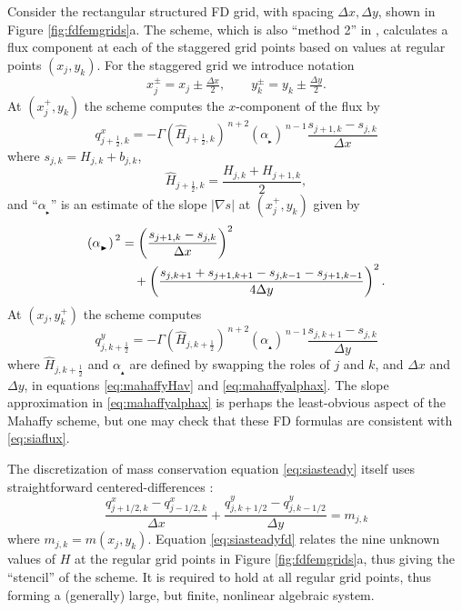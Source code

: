 \documentclass[twocolumn,letterpaper]{igs}
\newcommand{\grad}{\nabla}
\newcommand\alpharight{\alpha_{{}_{\blacktriangleright}}}
\newcommand\alphaup{\alpha_{{\!}_{\blacktriangle}}}
\newcommand{\dxtwo}{\tfrac{\Delta x}{2}}
\newcommand{\dytwo}{\tfrac{\Delta y}{2}}
\newcommand{\half}{\tfrac{1}{2}}
\begin{document}
Consider the rectangular structured FD grid, with spacing $\Delta x,\Delta y$, shown in Figure \ref{fig:fdfemgrids}a.  The \cite{Mahaffy1976} scheme, which is also ``method 2'' in \citep{HindmarshPayne1996}, calculates a flux component at each of the staggered grid points based on values at regular points $(x_j,y_k)$.  For the staggered grid we introduce notation
\begin{equation}
x_j^\pm = x_j \pm \dxtwo, \qquad y_k^\pm = y_k \pm \dytwo. \label{eq:definexypm}
\end{equation}
At $(x_j^+,y_k)$ the scheme computes the $x$-component of the flux by
\begin{equation}
q^x_{j+\half,k} = - \Gamma \left(\hat H_{j+\half,k}\right)^{\,n+2} \left(\alpharight\right)^{\,n-1} \frac{s_{j+1,k} - s_{j,k}}{\Delta x}  \label{eq:mahaffyqx}
\end{equation}
where $s_{j,k} = H_{j,k} + b_{j,k}$,
\begin{equation}
  \hat H_{j+\half,k} = \frac{H_{j,k} + H_{j+1,k}}{2},  \label{eq:mahaffyHav}
\end{equation}
and ``$\alpharight$\!'' is an estimate of the slope $|\grad s|$ at $(x_j^+,y_k)$ given by
\begin{align}
\left(\alpharight\right)^{\,2} &= \left(\frac{s_{j+1,k} - s_{j,k}}{\Delta x}\right)^2  \label{eq:mahaffyalphax} \\
  &\quad + \left(\frac{s_{j,k+1} + s_{j+1,k+1} - s_{j,k-1} - s_{j+1,k-1}}{4 \Delta y}\right)^2. \notag
\end{align}
At $(x_j,y_k^+)$ the scheme computes
\begin{equation}
q^y_{j,k+\half} = - \Gamma \left(\hat H_{j,k+\half}\right)^{\,n+2} \left(\alphaup\right)^{\,n-1} \frac{s_{j,k+1} - s_{j,k}}{\Delta y}  \label{eq:mahaffyqy}
\end{equation}
where $\hat H_{j,k+\half}$ and $\alphaup$ are defined by swapping the roles of $j$ and $k$, and $\Delta x$ and $\Delta y$, in equations \eqref{eq:mahaffyHav} and \eqref{eq:mahaffyalphax}.  The slope approximation in \eqref{eq:mahaffyalphax} is perhaps the least-obvious aspect of the Mahaffy scheme, but one may check that these FD formulas are consistent \citep{MortonMayers2005} with \eqref{eq:siaflux}.

The discretization of mass conservation equation \eqref{eq:siasteady} itself uses straightforward centered-differences \citep{MortonMayers2005}:
\begin{equation}
\frac{q^x_{j+1/2,k} - q^x_{j-1/2,k}}{\Delta x} + \frac{q^y_{j,k+1/2}- q^y_{j,k-1/2}}{\Delta y} = m_{j,k}  \label{eq:siasteadyfd}
\end{equation}
where $m_{j,k}=m(x_j,y_k)$.  Equation \eqref{eq:siasteadyfd} relates the nine unknown values of $H$ at the regular grid points in Figure \ref{fig:fdfemgrids}a, thus giving the ``stencil'' of the scheme.  It is required to hold at all regular grid points, thus forming a (generally) large, but finite, nonlinear algebraic system.
\end{document}
